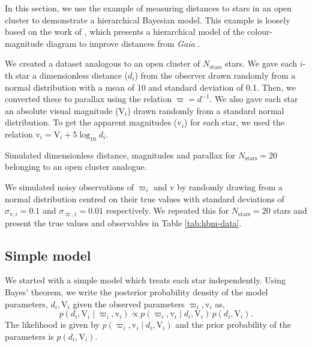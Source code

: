 \newcommand{\appmag}{\ensuremath{\mathrm{v}}}
\newcommand{\absmag}{\ensuremath{\mathrm{V}}}

In this section, we use the example of measuring distances to stars in an open cluster to demonstrate a hierarchical Bayesian model. This example is loosely based on the work of \citet{Leistedt.Hogg2017}, which presents a hierarchical model of the colour-magnitude diagram to improve distances from \emph{Gaia} \citep{GaiaCollaboration.Prusti.ea2016}. 

We created a dataset analogous to an open cluster of \(N_\mathrm{stars}\) stars. We gave each \(i\)-th star a dimensionless distance (\(d_i\)) from the observer drawn randomly from a normal distribution with a mean of 10 and standard deviation of 0.1. Then, we converted these to parallax using the relation \(\varpi = d^{-1}\). We also gave each star an absolute visual magnitude (\(\absmag_i\)) drawn randomly from a standard normal distribution. To get the apparent magnitudes (\(\appmag_i\)) for each star, we used the relation \(\appmag_i = \absmag_i + 5 \log_{10} d_i\).

\begin{table}[tb]
    \centering
    \caption{Simulated dimensionless distance, magnitudes and parallax for \(N_\mathrm{stars}=20\) belonging to an open cluster analogue.}
    \label{tab:hbm-data}
    
\end{table}

We simulated noisy observations of \(\varpi_i\) and \(\appmag\) by randomly drawing from a normal distribution centred on their true values with standard deviations of \(\sigma_{\appmag,i} = 0.1\) and \(\sigma_{\varpi,i} = 0.01\) respectively. We repeated this for \(N_\mathrm{stars}=20\) stars and present the true values and observables in Table \ref{tab:hbm-data}.

\subsection{Simple model}

We started with a simple model which treats each star independently. Using Bayes' theorem, we write the posterior probability density of the model parameters, \(d_i, \absmag_i\) given the observed parameters \(\varpi_i, \appmag_i\) as,
%
\begin{equation}
    p(d_i, \absmag_i \mid \varpi_i, \appmag_i) \propto p(\varpi_i, \appmag_i \mid d_i, \absmag_i) \, p(d_i, \absmag_i).
\end{equation}
%
The likelihood is given by \(p(\varpi_i, \appmag_i \mid d_i, \absmag_i)\) and the prior probability of the parameters is \(p(d_i, \absmag_i)\).

